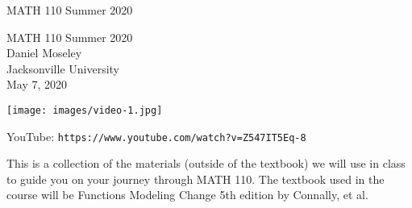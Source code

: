\documentclass[oneside,10pt,]{book}
\newcommand{\titlepagefont}{\relax}
\newcommand{\mono}[1]{\texttt{#1}}
\newlength{\qrsize}
\newlength{\previewwidth}
\begin{document}
\frontmatter
\thispagestyle{empty}
{\titlepagefont\centering
\vspace*{0.28\textheight}
{\Huge MATH 110 Summer 2020}\\}
\clearpage
\thispagestyle{empty}
\null%
\clearpage
\thispagestyle{empty}
{\titlepagefont\centering
\vspace*{0.14\textheight}
{\Huge MATH 110 Summer 2020}\\[3\baselineskip]
{\Large Daniel Moseley}\\[0.5\baselineskip]
{\Large Jacksonville University}\\[3\baselineskip]
{\Large May 7, 2020}\\}
\clearpage
\thispagestyle{empty}
\null\clearpage
\setlength{\qrsize}{9em}
\setlength{\previewwidth}{\linewidth}
\addtolength{\previewwidth}{-\qrsize}
\begin{tcbraster}[raster columns=2, raster column skip=1pt, raster halign=center, raster force size=false, raster left skip=0pt, raster right skip=0pt]%
\begin{tcolorbox}[previewstyle, width=\previewwidth]%
\texttt{[image: images/video-1.jpg]}%
\end{tcolorbox}%
\begin{tcolorbox}[qrstyle]%
{\hypersetup{urlcolor=black}}%
\end{tcolorbox}%
\begin{tcolorbox}[captionstyle]%
\small YouTube: \mono{https://www.youtube.com/watch?v=Z547IT5Eq-8}\end{tcolorbox}%
\end{tcbraster}%
This is a collection of the materials (outside of the textbook) we will use in class to guide you on your journey through MATH 110. The textbook used in the course will be Functions Modeling Change 5th edition by Connally, et al.%
\setcounter{tocdepth}{1}
\renewcommand*\contentsname{Contents}
\tableofcontents
\end{document}
